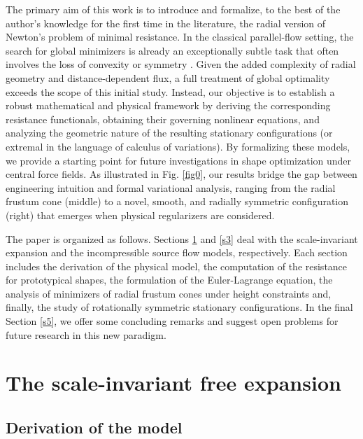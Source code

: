 \documentclass[a4paper,12pt]{amsart}
\theoremstyle{plain}
\theoremstyle{definition}
\begin{document}
The primary aim of this work is to introduce and formalize, to the best of the author's knowledge for the first time in the literature, the radial version of Newton's problem of minimal resistance. In the classical parallel-flow setting, the search for global minimizers is already an exceptionally subtle task that often involves the loss of convexity or symmetry \cite{buttazzo, lachand}. Given the added complexity of radial geometry and distance-dependent flux, a full treatment of global optimality exceeds the scope of this initial study. Instead, our objective is to establish a robust mathematical and  physical framework by deriving the corresponding resistance functionals, obtaining their governing nonlinear equations, and analyzing the geometric nature of the resulting  stationary configurations (or extremal in the language of calculus of variations). By formalizing these models, we provide a starting point for future investigations in shape optimization under central force fields. As illustrated in Fig. \ref{fig0}, our results bridge the gap between engineering intuition and formal variational analysis, ranging from the  radial frustum cone (middle) to a novel, smooth, and  radially symmetric configuration (right) that emerges when physical regularizers are considered.




The paper is organized as follows. Sections \ref{s2} and \ref{s3} deal with the scale-invariant expansion and the incompressible source flow models, respectively. Each section includes the derivation of the physical model, the computation of the resistance for prototypical shapes,  the formulation of the Euler-Lagrange equation, the analysis of minimizers of radial frustum cones under height constraints and, finally, the study of rotationally symmetric stationary configurations. In the final Section \ref{s5}, we offer some concluding remarks and suggest open problems for future research in this new  paradigm.
 

\section{The scale-invariant free expansion}\label{s2}
\subsection{Derivation of the model}
\end{document}
